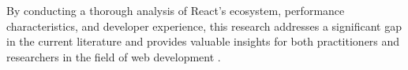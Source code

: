By conducting a thorough analysis of React's ecosystem, performance characteristics, and developer experience, this research addresses a significant gap in the current literature \cite{lee2022} and provides valuable insights for both practitioners and researchers in the field of web development \cite{nielsen2021}.
